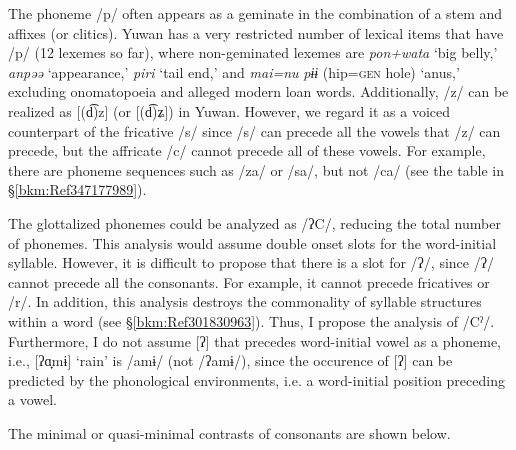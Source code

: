 The phoneme /p/ often appears as a geminate in the combination of a stem and affixes (or clitics). Yuwan has a very restricted number of lexical items that have /p/ (12 lexemes so far), where non-geminated lexemes are \textit{pon+wata} ‘big belly,’ \textit{anpəə} ‘appearance,’ \textit{piri} ‘tail end,’ and \textit{mai=nu} \textit{pɨɨ} (hip=\textsc{gen} hole) ‘anus,’ excluding onomatopoeia and alleged modern loan words. Additionally, /z/ can be realized as [(d͡)z] (or [(d͡)ʑ]) in Yuwan. However, we regard it as a voiced counterpart of the fricative /s/ since /s/ can precede all the vowels that /z/ can precede, but the affricate /c/ cannot precede all of these vowels. For example, there are phoneme sequences such as /za/ or /sa/, but not /ca/ (see the table in §\ref{bkm:Ref347177989}).

The glottalized phonemes could be analyzed as /ʔC/, reducing the total number of phonemes. This analysis would assume double onset slots for the word-initial syllable. However, it is difficult to propose that there is a slot for /ʔ/, since /ʔ/ cannot precede all the consonants. For example, it cannot precede fricatives or /r/. In addition, this analysis destroys the commonality of syllable structures within a word (see §\ref{bkm:Ref301830963}). Thus, I propose the analysis of /Cˀ/. Furthermore, I do not assume [ʔ] that precedes word-initial vowel as a phoneme, i.e., [ʔɑ̟mɨ] ‘rain’ is /amɨ/ (not /ʔamɨ/), since the occurence of [ʔ] can be predicted by the phonological environments, i.e. a word-initial position preceding a vowel.

The minimal or quasi-minimal contrasts of consonants are shown below.

